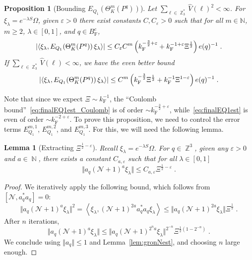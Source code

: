 \documentclass[12pt,a4paper]{article}
\numberwithin{equation}{section}
\newcommand{\cN}{\mathcal{N}}
\newcommand{\NNN}{\mathbb{N}}
\newcommand{\1}{\mathbb{I}}
\newcommand{\F}{\mathrm{F}}
\DeclareMathOperator{\N}{\mathbb{N}}
\DeclareMathOperator{\Z}{\mathbb{Z}}
\newcommand{\half}{\frac{1}{2}}
\newcommand{\eva}[1]{\left\langle #1 \right\rangle}
\theoremstyle{plain}
\newtheorem{lemma}[theorem]{Lemma}
\newtheorem{proposition}[theorem]{Proposition}
\theoremstyle{definition}
\theoremstyle{remark}
\theoremstyle{plain}
\theoremstyle{definition}
\theoremstyle{remark}
\begin{document}
\begin{proposition}[Bounding $E_{Q_1}(\Theta^m_{K}(P^q))$]\label{prop:finEQ1est}
Let $ \sum_{\ell \in \Z_3^*} \hat{V}(\ell)^2 < \infty $. For $\xi_\lambda = e^{-\lambda S} \Omega$, given $ \varepsilon > 0 $ there exist constants $ C, C_\varepsilon > 0 $ such that for all $ m \in \NNN $, $ m \ge 2 $, $ \lambda \in [0,1] $, and $ q \in B_{\F}^c $,
\begin{equation} \label{eq:finalEQ1est_Coulomb}
	\abs{\eva{\xi_\lambda, E_{Q_1}\!\left(\Theta^m_K(P^q)\right) \xi_\lambda}}
	\leq C_\varepsilon C^m \left( k_{\F}^{-\frac 32 + \varepsilon}
		+ k_{\F}^{-1 + \varepsilon} \Xi^\half \right)
		e(q)^{-1} \;.
\end{equation}
If $ \sum_{\ell \in \Z_3^*} \hat{V}(\ell) < \infty $, we have the even better bound
\begin{equation} \label{eq:finalEQ1est}
	\abs{\eva{\xi_\lambda, E_{Q_1}\!\left(\Theta^m_K(P^q)\right) \xi_\lambda}}
	\leq C^m \left(
		k_{\F}^{-\frac{3}{2}} \Xi^\half
		+ k_{\F}^{-1}\Xi^{1-\varepsilon} \right) e(q)^{-1} \;.
\end{equation}
\end{proposition}


\textcolor{green!30!black}{Note that since we expect $ \Xi \sim k_{\F}^{-1} $, the ``Coulomb bound''~\eqref{eq:finalEQ1est_Coulomb} is of order $ \sim k_{\F}^{-\frac 32 + \varepsilon} $, while~\eqref{eq:finalEQ1est} is even of order $ \sim k_{\F}^{-2 + \varepsilon} $.}
To prove this proposition, we need to control the error terms $ E^{m,1}_{Q_1} $, $ E^{m,2}_{Q_1} $, and $ E^{m,3}_{Q_1} $. For this, we will need the following lemma.

\begin{lemma} [Extracting $ \Xi^{\half-\varepsilon} $] \label{lem:Xi_halfminusepsilon}
Recall $ \xi_\lambda = e^{-\lambda S} \Omega $. For $ q \in \Z^3 $, given any $ \varepsilon > 0 $ and $ a \in \N $, there exists a constant $ C_{a,\varepsilon} $ such that for all $ \lambda \in [0,1] $
\begin{equation} \label{eq:Xi_halfminusepsilon}
	\Vert a_q (\cN + 1)^a \xi_\lambda \Vert
	\le C_{a,\varepsilon} \Xi^{\half-\varepsilon} \;.
\end{equation}
\end{lemma}

\begin{proof}
We iteratively apply the following bound, which follows from $ [\cN, a_q^* a_q] = 0 $:
\begin{equation}
	\Vert a_q (\cN + 1)^a \xi_\lambda \Vert^2
	= \eva{\xi_\lambda, (\cN + 1)^{2a} a_q^* a_q \xi_\lambda}
	\le \Vert a_q (\cN + 1)^{2a} \xi_\lambda \Vert \Xi^{\frac 12} \;.
\end{equation}
After $ n $ iterations,
\begin{equation}
	\Vert a_q (\cN + 1)^a \xi_\lambda \Vert
	\le \Vert a_q (\cN + 1)^{2^n a} \xi_\lambda \Vert^{2^{-n}} \Xi^{\half (1-2^{-n})} \;.
\end{equation}
We conclude using $ \Vert a_q \Vert \le 1 $ and Lemma~\ref{lem:gronNest}, and choosing $ n $ large enough.
\end{proof}
\end{document}
